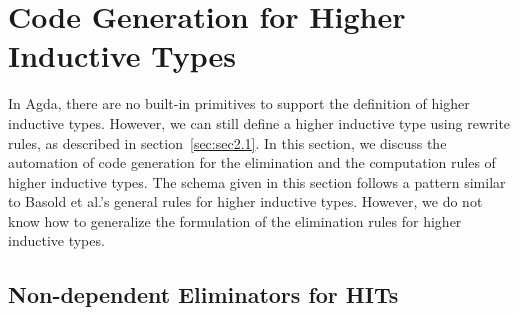 \documentclass[runningheads]{llncs}
\begin{document}
%
%

\section{Code Generation for Higher Inductive Types}
\label{sec:sec4}

In Agda, there are no built-in primitives to support the definition of higher inductive types.
However, we can still define a higher inductive type using rewrite rules, as described in section~\ref{sec:sec2.1}.
In this section, we discuss the automation of code generation for the elimination and the computation rules of higher inductive types. The schema given in this section follows a pattern similar to Basold et al.'s \cite{Basold-2017} general rules for higher inductive types. However, we do not know how to generalize the formulation of the elimination rules for higher inductive types.

\subsection{Non-dependent Eliminators for HITs}
\label{sec:sec4.1}
\end{document}
